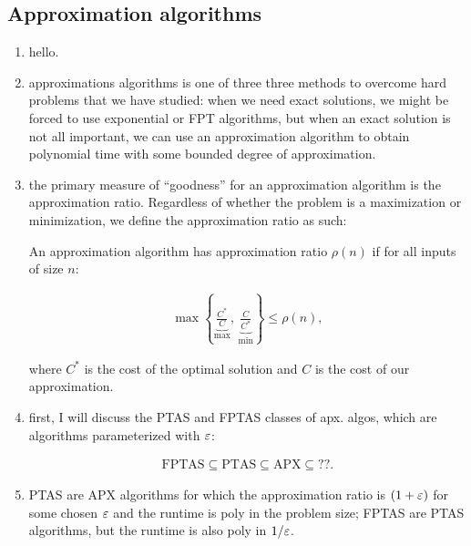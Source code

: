 \newpage
\subsection{Approximation algorithms}

\begin{enumerate}
  \item hello.

  \item approximations algorithms is one of three three methods to overcome hard
    problems that we have studied: when we need exact solutions, we might be
    forced to use exponential or FPT algorithms, but when an exact solution is
    not all important, we can use an approximation algorithm to obtain
    polynomial time with some bounded degree of approximation.

  \item the primary measure of ``goodness'' for an approximation algorithm is
    the approximation ratio. Regardless of whether the problem is a maximization
    or minimization, we define the approximation ratio as such:

    An approximation algorithm has approximation ratio $\rho(n)$ if for all
    inputs of size $n$:

    \begin{textred}
      \begin{align}
        \max\left\{\underbrace{\frac{C^\ast}{C}}_{\text{max}},\,
        \underbrace{\frac{C}{C^\ast}}_{\text{min}} \right\} \leq \rho(n),
      \end{align}
    \end{textred}

    where $C^\ast$ is the cost of the optimal solution and $C$ is the cost of our
    approximation.

  \item first, I will discuss the PTAS and FPTAS classes of apx. algos, 
    which are algorithms parameterized with $\varepsilon$:

    \begin{textred}
      \begin{align}
        \text{FPTAS} \subseteq \text{PTAS} \subseteq \text{APX} \subseteq
        \text{??}.
      \end{align}
    \end{textred}

  \item PTAS are APX algorithms for which the approximation ratio is $(1 +
    \varepsilon)$ for some chosen $\varepsilon$ and the runtime is poly in the problem size;
    FPTAS are PTAS algorithms, but the runtime is also poly in $1/\varepsilon$.


\end{enumerate}
